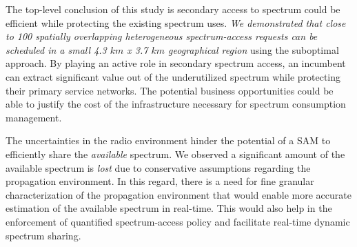 \documentclass[12pt, draftclsnofoot, onecolumn]{IEEEtran}
\begin{document}
The top-level conclusion of this study is secondary access to spectrum could be efficient while protecting the existing spectrum uses. \textit{We demonstrated that close to 100 spatially overlapping heterogeneous spectrum-access requests can be scheduled in a small 4.3 $km$ x 3.7 $km$ geographical region} using the suboptimal approach.  By playing an active role in secondary spectrum access, an incumbent can extract significant value out of the underutilized spectrum while protecting their primary service networks. The potential business opportunities could be able to justify the cost of the infrastructure necessary for spectrum consumption management.

The uncertainties in the radio environment hinder the potential of a SAM to efficiently share the \textit{available} spectrum. We observed a significant amount of the available spectrum is \textit{lost} due to conservative assumptions regarding the propagation environment. In this regard, there is a need for fine granular characterization of the propagation environment that would enable more accurate estimation of the available spectrum in real-time. This would also help in the enforcement of quantified spectrum-access policy and facilitate real-time dynamic spectrum sharing.
\end{document}
